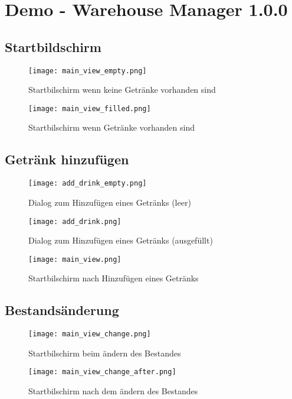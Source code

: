 \chapter{Demo - Warehouse Manager 1.0.0}

\section{Startbildschirm}

\begin{figure}[h!]
    \texttt{[image: main\_view\_empty.png]}
    \caption{Startbilschirm wenn keine Getränke vorhanden sind}
    \label{fig:main_view_empty}
\end{figure}

\begin{figure}[h!]
    \texttt{[image: main\_view\_filled.png]}
    \caption{Startbilschirm wenn Getränke vorhanden sind}
    \label{fig:main_view_filled}
\end{figure}

\clearpage

\section{Getränk hinzufügen}

\begin{figure}[h!]
    \texttt{[image: add\_drink\_empty.png]}
    \caption{Dialog zum Hinzufügen eines Getränks (leer)}
    \label{fig:add_drink_empty}
\end{figure}

\begin{figure}[h!]
    \texttt{[image: add\_drink.png]}
    \caption{Dialog zum Hinzufügen eines Getränks (ausgefüllt)}
    \label{fig:add_drink}
\end{figure}

\begin{figure}[h!]
    \texttt{[image: main\_view.png]}
    \caption{Startbilschirm nach Hinzufügen eines Getränks}
    \label{fig:main_view}
\end{figure}

\clearpage

\section{Bestandsänderung}


\begin{figure}[h!]
    \texttt{[image: main\_view\_change.png]}
    \caption{Startbilschirm beim ändern des Bestandes}
    \label{fig:main_view_change}
\end{figure}

\begin{figure}[h!]
    \texttt{[image: main\_view\_change\_after.png]}
    \caption{Startbilschirm nach dem ändern des Bestandes}
    \label{fig:main_view_change_after}
\end{figure}